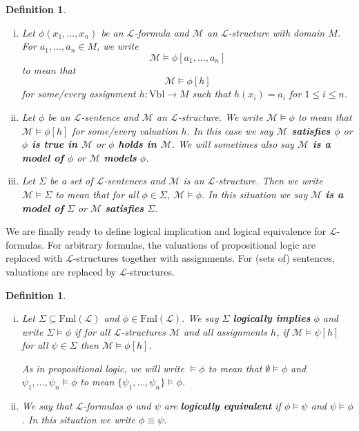 \documentclass[11pt]{article}
\newcommand{\Fml}{\textrm{Fml}}
\newcommand{\Vbl}{\textrm{Vbl}}
\newtheorem{definition}[theorem]{Definition}
\newcommand{\mcal}[1]{\mathcal{#1}}
\begin{document}
\begin{definition}
\
\begin{enumerate}[(i)]
\item Let $\phi(x_1,\ldots,x_n)$ be an $\mcal{L}$-formula and $\mcal{M}$ an $\mcal{L}$-structure with domain $M$. For $a_1,\ldots,a_n\in M$, we write
\[\mcal{M}\models \phi[a_1,\ldots,a_n]\] to mean that
\[\mcal{M}\models \phi[h]\] for some/every assignment $h:\Vbl\rightarrow M$ such that $h(x_i)=a_i$ for $1\leq i\leq n$.
\item Let $\phi$ be an $\mcal{L}$-sentence and $\mcal{M}$ an $\mcal{L}$-structure. We write $\mcal{M}\models \phi$ to mean that $\mcal{M}\models \phi[h]$ for some/every valuation $h$. In this case we say \textbf{$\mcal{M}$ satisfies $\phi$} or \textbf{$\phi$ is true in $\mcal{M}$} or \textbf{$\phi$ holds in $\mcal{M}$}. We will sometimes also say \textbf{$\mcal{M}$ is a model of $\phi$} or $\mcal{M}$ \textbf{models} $\phi$.
\item Let $\Sigma$ be a set of $\mcal{L}$-sentences and $\mcal{M}$ is an $\mcal{L}$-structure. Then we write $\mcal{M}\models \Sigma$ to mean that for all $\phi\in \Sigma$, $\mcal{M}\models \phi$. In this situation we say $\mcal{M}$ \textbf{is a model of} $\Sigma$ or $\mcal{M}$ \textbf{satisfies} $\Sigma$.
\end{enumerate}
\end{definition}


We are finally ready to define logical implication and logical equivalence for $\mcal{L}$-formulas. For arbitrary formulas, the valuations of propositional logic are replaced with $\mcal{L}$-structures together with assignments. For (sets of) sentences, valuations are replaced by $\mcal{L}$-structures.

\begin{definition}
\
\begin{enumerate}[(i)]
\item
Let $\Sigma\subseteq \Fml(\mcal{L})$ and $\phi\in \Fml(\mcal{L})$. We say $\Sigma$ \textbf{logically implies} $\phi$ and write $\Sigma\models \phi$ if for all $\mcal{L}$-structures $\mcal{M}$ and all assignments $h$, if $\mcal{M}\models \psi[h]$ for all $\psi\in \Sigma$ then $\mcal{M}\models \phi[h]$.

\medskip

As in propositional logic, we will write $\models \phi$ to mean that $\emptyset \models \phi$ and $\psi_1,\ldots,\psi_n\models \phi$ to mean $\{\psi_1,\ldots,\psi_n\}\models \phi$.
\item We say that $\mcal{L}$-formulas $\phi$ and $\psi$ are \textbf{logically equivalent} if $\phi\models \psi$ and $\psi\models \phi$. In this situation we write $\phi\equiv \psi$.
\end{enumerate}
\end{definition}
\end{document}

